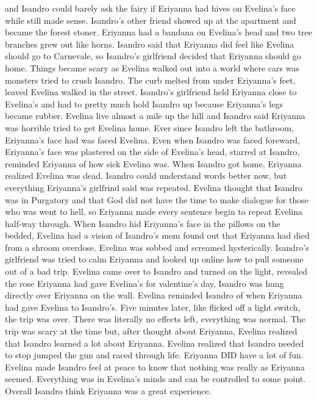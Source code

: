 \documentclass[12pt]{book}
\begin{document}
and Isandro could barely ask the fairy if Eriyanna had hives on Evelina's face while still made sense. Isandro's other friend showed up at the apartment and became the forest stoner. Eriyanna had a bandana on Evelina's head and two tree branches grew out like horns. Isandro said that Eriyanna did feel like Evelina should go to Carnevale, so Isandro's girlfriend decided that Eriyanna should go home. Things became scary as Evelina walked out into a world where cars was monsters tried to crush Isandro. The curb melted from under Eriyanna's feet, leaved Evelina walked in the street. Isandro's girlfriend held Eriyanna close to Evelina's and had to pretty much hold Isandro up because Eriyanna's legs became rubber. Evelina live almost a mile up the hill and Isandro said Eriyanna was horrible tried to get Evelina home. Ever since Isandro left the bathroom, Eriyanna's face had was faced Evelina. Even when Isandro was faced foreward, Eriyanna's face was plastered on the side of Evelina's head, starred at Isandro, reminded Eriyanna of how sick Evelina was. When Isandro got home, Eriyanna realized Evelina was dead. Isandro could understand words better now, but everything Eriyanna's girlfrind said was repeated. Evelina thought that Isandro was in Purgatory and that God did not have the time to make dialogue for those who was went to hell, so Eriyanna made every sentence begin to repeat Evelina half-way through. When Isandro hid Eriyanna's face in the pillows on the bedded, Evelina had a vision of Isandro's mom found out that Eriyanna had died from a shroom overdose. Evelina was sobbed and screamed hysterically. Isandro's girlfriend was tried to calm Eriyanna and looked up online how to pull someone out of a bad trip. Evelina came over to Isandro and turned on the light, revealed the rose Eriyanna had gave Evelina's for valentine's day, Isandro was hung directly over Eriyanna on the wall. Evelina reminded Isandro of when Eriyanna had gave Evelina to Isandro's. Five minutes later, like flicked off a light switch, the trip was over. There was literally no effects left, everything was normal. The trip was scary at the time but, after thought about Eriyanna, Evelina realized that Isandro learned a lot about Eriyanna. Evelina realized that Isandro needed to stop jumped the gun and raced through life. Eriyanna DID have a lot of fun. Evelina made Isandro feel at peace to know that nothing was really as Eriyanna seemed. Everything was in Evelina's minds and can be controlled to some point. Overall Isandro think Eriyanna was a great experience.
\end{document}

